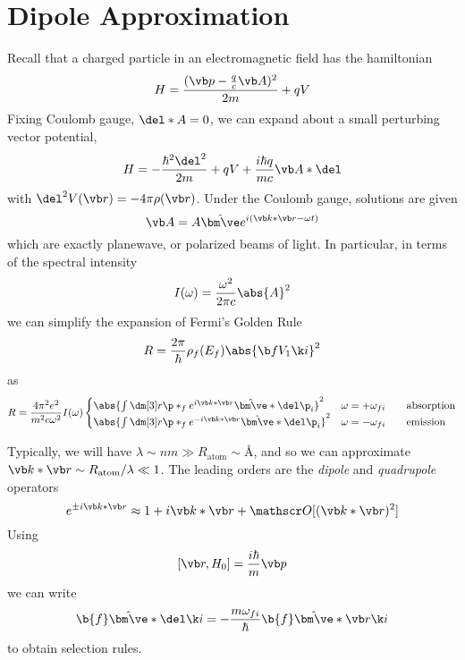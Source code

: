 \documentclass[12pt]{article}
\begin{document}
\section{Dipole Approximation}
Recall that a charged particle in an electromagnetic field has the hamiltonian
\begin{equation}
    H = \frac{(\vb p- \frac{q}{c}\vb A)^2}{2m}+qV
\end{equation}
Fixing Coulomb gauge, \( \del*A=0 \), we can expand about a small perturbing vector potential,
\begin{equation}
    H=-\frac{\hbar^2\del^2}{2m}+qV + \frac{i\hbar q}{mc}\vb A*\del 
\end{equation}
with \( \del^2 V(\vb r) =-4\pi \rho(\vb r) \). Under the Coulomb gauge, solutions are given
\begin{equation}
    \vb A = A\hat{\bm \ve} e^{i(\vb k*\vb r-\omega t)}
\end{equation}
which are exactly planewave, or polarized beams of light. In particular, in terms of the spectral intensity
\begin{equation}
    I(\omega) = \frac{\omega^2}{2\pi c}\abs{A}^2
\end{equation}
we can simplify the expansion of Fermi's Golden Rule
\begin{equation}
    R = \frac{2\pi}{\hbar}\rho_f(E_f)\abs{\b f V_1 \k i}^2
\end{equation}
as
\begin{equation}
    R = \frac{4\pi^2 e^2}{m^2c\omega^2}I(\omega)\begin{cases}
        \abs{\int\dm[3]r \p\ast_f e^{i\vb k*\vb r}\hat{\bm \ve}*\del \p_i}^2 & \omega=+\omega_{fi} \qquad\text{absorption}\\
        \abs{\int\dm[3]r \p\ast_f e^{-i\vb k*\vb r}\hat{\bm \ve}*\del \p_i}^2 & \omega=-\omega_{fi} \qquad\text{emission}\\
    \end{cases}
\end{equation}

Typically, we will have \( \lambda\sim\si{nm}\gg R_\text{atom}\sim\si{\angstrom} \), and so we can approximate \( \vb k*\vb r\sim R_\text{atom}/\lambda\ll 1 \). The leading orders are the \emph{dipole} and \emph{quadrupole} operators
\[ e^{\pm i\vb k*\vb r}\approx 1+i\vb k*\vb r+\mathscr O[(\vb k*\vb r)^2] \]
Using
\[ [\vb r, H_0]=\frac{i\hbar}{m}\vb p \]
we can write
\begin{equation}
    \b{f}\hat{\bm\ve}*\del \k i = -\frac{m\omega_{fi}}{\hbar}\b{f}\hat{\bm \ve}*\vb r\k i
\end{equation}
to obtain selection rules.
\end{document}
